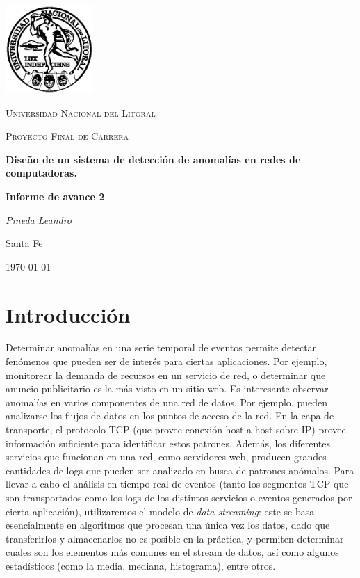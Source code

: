 \documentclass[a4paper,10pt, oneside]{article}
\begin{document}
	
\begin{titlepage}
	\centering
	\includegraphics[width=0.25\textwidth]{../../Universidad_del_Litoral}\par\vspace{1cm}
	{\scshape\LARGE Universidad Nacional del Litoral \par}
	\vspace{1cm}
	{\scshape\Large Proyecto Final de Carrera\par}
	\vspace{1.5cm}
	{\huge\bfseries Diseño de un sistema de detección de anomalías en redes de computadoras.\par}
	\vspace{4cm}
	{\huge\bfseries Informe de avance 2\par}
	\vfill
	
	{\Large \itshape Pineda Leandro\par}
	
	
	\large Santa Fe\par
	{\large \today\par}	
\end{titlepage}

\modulolinenumbers[5]
\linenumbers

\section{Introducción}
Determinar anomalías en una serie temporal de eventos permite detectar fenómenos que pueden ser de interés para ciertas aplicaciones. Por ejemplo, monitorear la demanda de recursos en un servicio de red, o determinar que anuncio publicitario es la más visto en un sitio web.
Es interesante observar anomalías en varios componentes de una red de datos. Por ejemplo, pueden analizarse los flujos de datos en los puntos de acceso de la red. En la capa de transporte, el protocolo TCP (que provee conexión host a host sobre IP) provee información suficiente para identificar estos patrones. Además, los diferentes servicios que funcionan en una red, como servidores web, producen grandes cantidades de logs que pueden ser analizado en busca de patrones anómalos.
Para llevar a cabo el análisis en tiempo real de eventos (tanto los segmentos TCP que son transportados como los logs de los distintos servicios o eventos generados por cierta aplicación), utilizaremos el modelo de \textit{data streaming}: este se basa esencialmente en algoritmos que procesan una única vez los datos, dado que transferirlos y almacenarlos no es posible en la práctica, y permiten determinar cuales son los elementos más comunes en el stream de datos, así como algunos estadísticos (como la media, mediana, histograma), entre otros.
\end{document}
